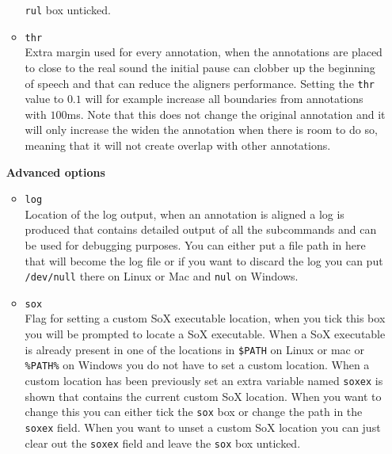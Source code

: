 \begin{itemize}
\begin{itemize}
				\texttt{rul} box unticked.
			\item \texttt{thr}\\
				Extra margin used for every annotation, when the annotations are placed
				to close to the real sound the initial pause can clobber up the
				beginning of speech and that can reduce the aligners performance.
				Setting the \texttt{thr} value to $0.1$ will for example increase all
				boundaries from annotations with $100$ms. Note that this does not
				change the original annotation and it will only increase the widen the
				annotation when there is room to do so, meaning that it will not create
				overlap with other annotations.
		\end{itemize}

		\textbf{Advanced options}
		\begin{itemize}
			\item \texttt{log}\\
				Location of the log output, when an annotation is aligned a log is
				produced that contains detailed output of all the subcommands and can
				be used for debugging purposes. You can either put a file path in here
				that will become the log file or if you want to discard the log you can
				put \texttt{/dev/null} there on Linux or Mac and \texttt{nul} on
				Windows.
			\item \texttt{sox}\\
				Flag for setting a custom SoX executable location, when you tick this
				box you will be prompted to locate a SoX executable. When a SoX
				executable is already present in one of the locations in
				\texttt{\$PATH} on Linux or mac or \texttt{\%PATH\%} on Windows you do
				not have to set a custom location. When a custom location has been
				previously set an extra variable named \texttt{soxex} is shown that
				contains the current custom SoX location. When you want to change this
				you can either tick the \texttt{sox} box or change the path in the
				\texttt{soxex} field.  When you want to unset a custom SoX location you
				can just clear out the \texttt{soxex} field and leave the \texttt{sox}
				box unticked.


\end{itemize}
\end{itemize}
